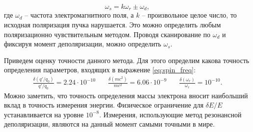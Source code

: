 \begin{equation}
\omega_s=  k\omega_{r} \pm \omega_d,
\end{equation}
где $\omega_d$ -- частота электромагнитного поля, а $k$ -- произвольное целое число,  то исходная поляризация пучка нарушается. Это можно определить любым поляризационно чувствительным методом. Проводя сканирование по $\omega_d$ и фиксируя момент деполяризации, можно определить $\omega_s$.
\par Приведем оценку точности данного метода. Для этого определим какова точность определения параметров, входящих в выражение \ref{eq:spin_freq}:
\[
	\begin{matrix}
	  \displaystyle \frac{\delta (q'/q_0)}{q'/q_0} = 2.24 \cdot 10^{-10} \quad
	& \displaystyle \frac{\delta (mc^2)}{mc^2}= 6.06\cdot10^{-9} \quad
	& \displaystyle \frac{\delta (\omega_r)}{\omega_r} = 10^{-10}.
	\end{matrix}
\]
\noindent Можно заметить, что точность определения массы электрона вносит наибольший вклад в точность измерения энергии. Физическое ограничение для $\delta E/E$ устанавливается на уровне $10^{-8}$. Измерения, использующие метод резонансной деполяризации, являются на данный момент самыми точными в мире.
